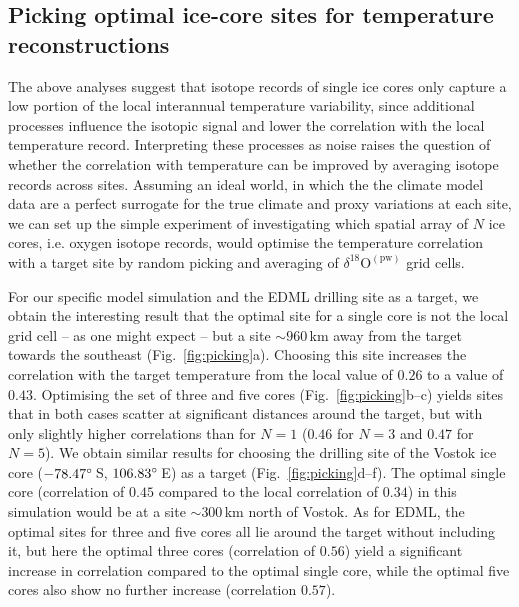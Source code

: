 \documentclass[cp, manuscript]{copernicus}
\begin{document}
\subsection{Picking optimal ice-core sites for temperature reconstructions}
\label{results:picking}

The above analyses suggest that isotope records of single ice cores only
capture a low portion of the local interannual temperature variability, since
additional processes influence the isotopic signal and lower the correlation
with the local temperature record. Interpreting these processes as noise raises
the question of whether the correlation with temperature can be improved by
averaging isotope records across sites. Assuming an ideal world, in which the
the climate model data are a perfect surrogate for the true climate and proxy
variations at each site, we can set up the simple experiment of investigating
which spatial array of $N$ ice cores, i.e. oxygen isotope records, would
optimise the temperature correlation with a target site by random picking and
averaging of $\delta^{18}\mathrm{O}^{\mathrm{(pw)}}$ grid cells.

For our specific model simulation and the EDML drilling site as a target, we
obtain the interesting result that the optimal site for a single core is not the
local grid cell -- as one might expect -- but a site $\sim960$\,km away from the
target towards the southeast (Fig.~\ref{fig:picking}a). Choosing this site
increases the correlation with the target temperature from the local value of
$0.26$ to a value of $0.43$. Optimising the set of three and five cores
(Fig.~\ref{fig:picking}b--c) yields sites that in both cases scatter at
significant distances around the target, but with only slightly higher
correlations than for $N=1$ ($0.46$ for $N=3$ and $0.47$ for $N=5$). We obtain
similar results for choosing the drilling site of the Vostok ice core
($-78.47^{\circ}$\,S, $106.83^{\circ}$\,E) as a target
(Fig.~\ref{fig:picking}d--f). The optimal single core (correlation of $0.45$
compared to the local correlation of $0.34$) in this simulation would be at a
site $\sim300$\,km north of Vostok. As for EDML, the optimal sites for three and
five cores all lie around the target without including it, but here the optimal
three cores (correlation of $0.56$) yield a significant increase in correlation
compared to the optimal single core, while the optimal five cores also show no
further increase (correlation $0.57$).
\end{document}
